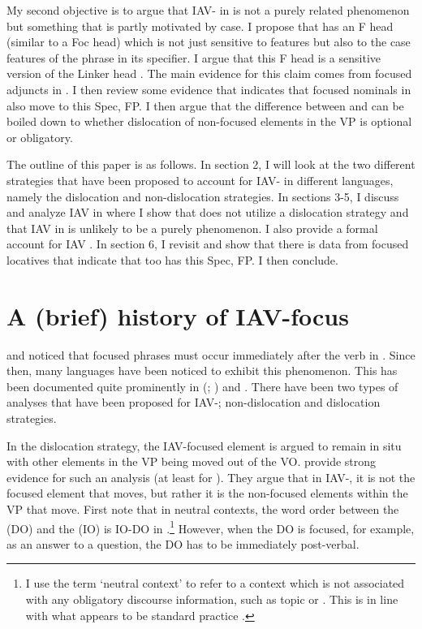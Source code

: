 \documentclass[output=paper
,newtxmath
,modfonts
,nonflat]{langsci/langscibook}
\begin{document}
My second objective is to argue that IAV- in  is not a purely  related phenomenon but something that is partly motivated by case. I propose that  has an F head (similar to a Foc head) which is not just sensitive to  features but also to the case features of the phrase in its specifier. I argue that this F head is a  sensitive version of the Linker head \citep{Baker2006}. The main evidence for this claim comes from focused adjuncts in . I then review some evidence that indicates that focused nominals in  also move to this Spec, FP. I then argue that the difference between  and  can be boiled down to whether dislocation of non-focused elements in the VP is optional or obligatory.

The outline of this paper is as follows. In section 2, I will look at the two different strategies that have been proposed to account for IAV- in different  languages, namely the dislocation and non-dislocation strategies. In sections 3-5, I discuss and analyze IAV  in  where I show that  does not utilize a dislocation strategy and that IAV  in  is unlikely to be a purely  phenomenon. I also provide a formal account for  IAV . In section 6, I revisit  and show that there is data from focused locatives that indicate that  too has this Spec, FP. I then conclude.

\section{ A (brief) history of IAV-focus}

\citet{hyman1979nounstructure} and \citet{watters1979} noticed that focused phrases must occur immediately after the verb in . Since then, many  languages have been noticed to exhibit this phenomenon. This has been documented quite prominently in  (\citealt{Buell2009}; \citealt{chengdowning2012}) and  \citep{vanderwal2006}. There have been two types of analyses that have been proposed for IAV-; non-dislocation and dislocation strategies. 

In the dislocation strategy, the IAV-focused element is argued to remain in situ with other elements in the VP being moved out of the VO. \citet{chengdowning2012} provide strong evidence for such an analysis (at least for ). They argue that in  IAV-, it is not the focused element that moves, but rather it is the non-focused elements within the VP that move. First note that in neutral contexts, the word order between the  (DO) and the  (IO) is IO-DO in .\footnote{I use the term ‘neutral context’ to refer to a context which is not associated with any obligatory discourse information, such as topic or . This is in line with what appears to be standard practice \citep{Diercks2013,diercks2015}.}  However, when the DO is focused, for example, as an answer to a question, the DO has to be immediately post-verbal.
\end{document}
